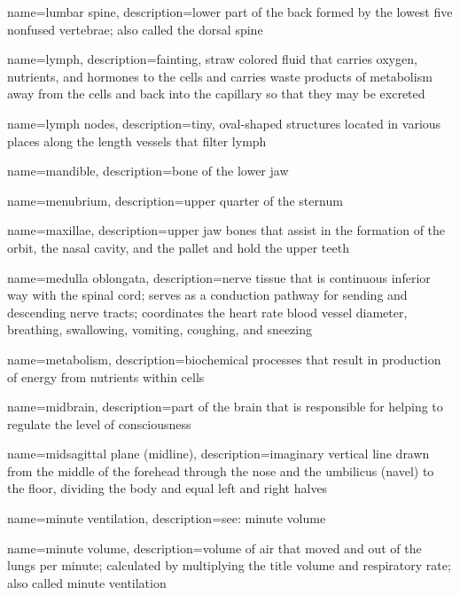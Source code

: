 \documentclass[../../EMT-169.tex]{subfiles}
\begin{document}
	{
		name=lumbar spine,
		description={lower part of the back formed by the lowest five nonfused vertebrae; also called the dorsal spine}
	}
	
	{
		name=lymph,
		description={fainting, straw colored fluid that carries oxygen, nutrients, and hormones to the cells and carries waste products of metabolism away from the cells and back into the capillary so that they may be excreted}
	}
	
	{
		name=lymph nodes,
		description={tiny, oval-shaped structures located in various places along the length vessels that filter lymph}
	}

	{
		name=mandible,
		description={bone of the lower jaw}
	}
	
	{
		name=menubrium,
		description={upper quarter of the sternum}
	}
	
	{
		name=maxillae,
		description={upper jaw bones that assist in the formation of the orbit, the nasal cavity, and the pallet and hold the upper teeth}
	}
	
	{
		name=medulla oblongata,
		description={nerve tissue that is continuous inferior way with the spinal cord; serves as a conduction pathway for sending and descending nerve tracts; coordinates the heart rate blood vessel diameter, breathing, swallowing, vomiting, coughing, and sneezing}
	}
	
	{
		name=metabolism,
		description={biochemical processes that result in production of energy from nutrients within cells}
	}
	
	{
		name=midbrain,
		description={part of the brain that is responsible for helping to regulate the level of consciousness}
	}
	
	{
		name=midsagittal plane (midline),
		description={imaginary vertical line drawn from the middle of the forehead through the nose and the umbilicus (navel) to the floor, dividing the body and equal left and right halves}
	}
	
	{
		name=minute ventilation,
		description={see: minute volume}
	}
	
	{
		name=minute volume,
		description={volume of air that moved and out of the lungs per minute; calculated by multiplying the title volume and respiratory rate; also called minute ventilation}
	}
	
\end{document}
